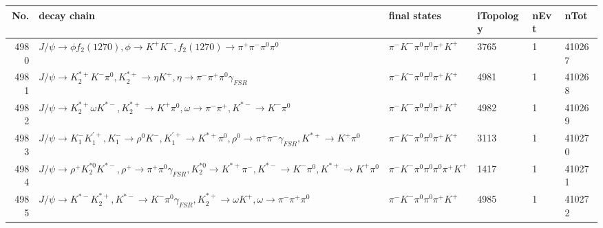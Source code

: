 \begin{table}[htbp] 
\begin{center}
\begin{small}
\begin{tabular}{rlllll}\hline\hline
 No. & decay chain & final states &  iTopology & nEvt & nTot \\\hline
4980&$J/\psi       \rightarrow \phi           f_{2}(1270)    , \phi            \rightarrow K^{+}          K^{-}          , f_{2}(1270)     \rightarrow \pi^{+}        \pi^{-}        \pi^{0}        \pi^{0}        $&$\pi^{-}        K^{-}          \pi^{0}        \pi^{0}        \pi^{+}        K^{+}          $& 3765&    1&410267\\
4981&$J/\psi       \rightarrow K_2^{*+}       K^{-}          \pi^{0}        , K_2^{*+}        \rightarrow \eta          K^{+}          , \eta           \rightarrow \pi^{-}        \pi^{+}        \pi^{0}        \gamma_{FSR} $&$\pi^{-}        K^{-}          \pi^{0}        \pi^{0}        \pi^{+}        K^{+}          $& 4981&    1&410268\\
4982&$J/\psi       \rightarrow K_2^{*+}       \omega         K^{*-}         , K_2^{*+}        \rightarrow K^{+}          \pi^{0}        , \omega          \rightarrow \pi^{-}        \pi^{+}        , K^{*-}          \rightarrow K^{-}          \pi^{0}        $&$\pi^{-}        K^{-}          \pi^{0}        \pi^{0}        \pi^{+}        K^{+}          $& 4982&    1&410269\\
4983&$J/\psi       \rightarrow K_{1}^{-}      K_1^{'+}      , K_{1}^{-}       \rightarrow \rho^{0}      K^{-}          , K_1^{'+}       \rightarrow K^{*+}         \pi^{0}        , \rho^{0}       \rightarrow \pi^{+}        \pi^{-}        \gamma_{FSR} , K^{*+}          \rightarrow K^{+}          \pi^{0}        $&$\pi^{-}        K^{-}          \pi^{0}        \pi^{0}        \pi^{+}        K^{+}          $& 3113&    1&410270\\
4984&$J/\psi       \rightarrow \rho^{+}      K_2^{*0}       K^{*-}         , \rho^{+}       \rightarrow \pi^{+}        \pi^{0}        \gamma_{FSR} , K_2^{*0}        \rightarrow K^{*+}         \pi^{-}        , K^{*-}          \rightarrow K^{-}          \pi^{0}        , K^{*+}          \rightarrow K^{+}          \pi^{0}        $&$\pi^{-}        K^{-}          \pi^{0}        \pi^{0}        \pi^{0}        \pi^{+}        K^{+}          $& 1417&    1&410271\\
4985&$J/\psi       \rightarrow K^{*-}         K_2^{*+}       , K^{*-}          \rightarrow K^{-}          \pi^{0}        \gamma_{FSR} , K_2^{*+}        \rightarrow \omega         K^{+}          , \omega          \rightarrow \pi^{-}        \pi^{+}        \pi^{0}        $&$\pi^{-}        K^{-}          \pi^{0}        \pi^{0}        \pi^{+}        K^{+}          $& 4985&    1&410272\\

\end{tabular}
\end{small}
\end{center}
\end{table}
